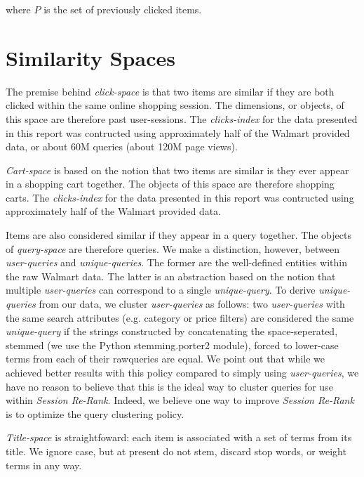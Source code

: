 \documentclass{article}
\begin{document}
where $P$ is the set of previously clicked items. 

\section{Similarity Spaces}

The premise behind {\em click-space} is that two items are similar if they are
both clicked within the same online shopping session. The dimensions, or
objects, of this space are therefore past user-sessions. The {\em clicks-index}
for the data presented in this report was contructed using approximately half of
the Walmart provided data, or about 60M queries (about 120M page views).

{\em Cart-space} is based on the notion that two items are similar is they ever
appear in a shopping cart together. The objects of this space are therefore
shopping carts. The {\em clicks-index} for the data presented in this report was
contructed using approximately half of the Walmart provided data.

Items are also considered similar if they appear in a query together. The
objects of {\em query-space} are therefore queries. We make a distinction,
however, between {\em user-queries} and {\em unique-queries}. The former are the
well-defined entities within the raw Walmart data. The latter is an abstraction
based on the notion that multiple {\em user-queries} can correspond to a single
{\em unique-query}. To derive {\em unique-queries} from our data, we cluster
{\em user-queries} as follows: two {\em user-queries} with the same search
attributes (e.g. category or price filters) are considered the same {\em
unique-query} if the strings constructed by concatenating the space-seperated,
stemmed (we use the Python stemming.porter2 module), forced to lower-case terms
from each of their rawqueries are equal. We point out that while we achieved
better results with this policy compared to simply using {\em user-queries}, we
have no reason to believe that this is the ideal way to cluster queries for use
within {\em Session Re-Rank}. Indeed, we believe one way to improve {\em Session
Re-Rank} is to optimize the query clustering policy.

{\em Title-space} is straightfoward: each item is associated with a set of terms
from its title. We ignore case, but at present do not stem, discard stop words,
or weight terms in any way. 
\end{document}

